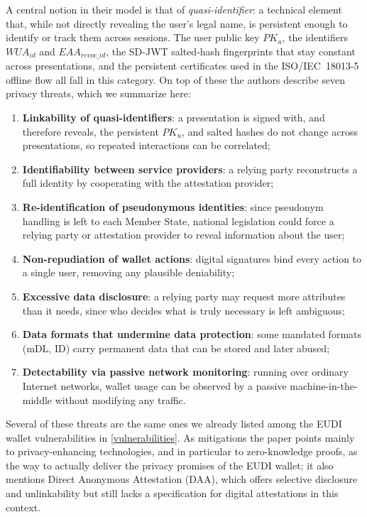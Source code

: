 \documentclass{article}
\begin{document}
A central notion in their model is that of \emph{quasi-identifier}: a technical element that, while not directly
revealing the user's legal name, is persistent enough to identify or track them across sessions. The user public key
$PK_u$, the identifiers $WUA_{id}$ and $EAA_{revoc\_id}$, the SD-JWT salted-hash fingerprints that stay constant across
presentations, and the persistent certificates used in the ISO/IEC~18013-5 offline flow all fall in this category. On
top of these the authors describe seven privacy threats, which we summarize here:
\begin{enumerate}[noitemsep]
  \item \textbf{Linkability of quasi-identifiers}: a presentation is signed with, and therefore reveals, the persistent $PK_u$, and salted hashes do not change across presentations, so repeated interactions can be correlated;
  \item \textbf{Identifiability between service providers}: a relying party reconstructs a full identity by cooperating with the attestation provider;
  \item \textbf{Re-identification of pseudonymous identities}: since pseudonym handling is left to each Member State, national legislation could force a relying party or attestation provider to reveal information about the user;
  \item \textbf{Non-repudiation of wallet actions}: digital signatures bind every action to a single user, removing any plausible deniability;
  \item \textbf{Excessive data disclosure}: a relying party may request more attributes than it needs, since who decides what is truly necessary is left ambiguous;
  \item \textbf{Data formats that undermine data protection}: some mandated formats (mDL, ID) carry permanent data that can be stored and later abused;
  \item \textbf{Detectability via passive network monitoring}: running over ordinary Internet networks, wallet usage can be observed by a passive machine-in-the-middle without modifying any traffic.
\end{enumerate}
Several of these threats are the same ones we already listed among the EUDI wallet vulnerabilities in
\cref{vulnerabilities}. As mitigations the paper points mainly to privacy-enhancing technologies, and in particular to
zero-knowledge proofs, as the way to actually deliver the privacy promises of the EUDI wallet; it also mentions Direct
Anonymous Attestation (DAA), which offers selective disclosure and unlinkability but still lacks a specification for
digital attestations in this context.
\end{document}
